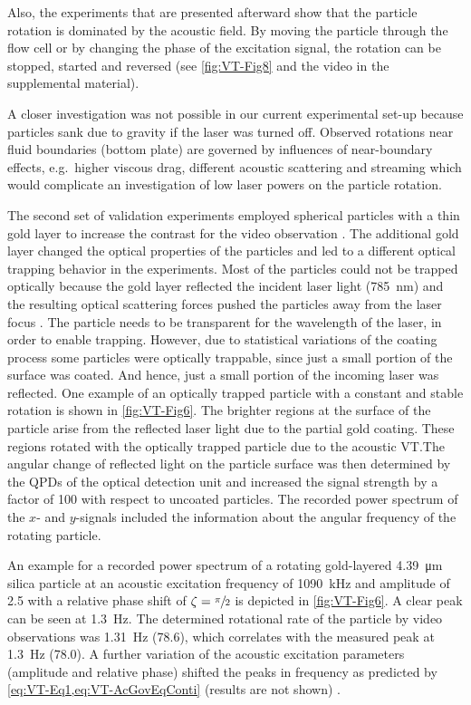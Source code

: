 Also, the experiments that are presented afterward show that the particle 
rotation is dominated by the acoustic field. By moving the particle through the 
flow cell or by changing the phase of the excitation signal, the rotation can be 
stopped, started and reversed (see \cref{fig:VT-Fig8} and the video in the 
supplemental material).

A closer investigation was not possible in our current experimental set-up 
because particles sank due to gravity if the laser was turned off. Observed 
rotations near fluid boundaries (bottom plate) are governed by influences of 
near-boundary effects, e.g.\ higher viscous drag, different acoustic scattering 
and streaming which would complicate an investigation of low laser powers on the 
particle rotation.

The second set of validation experiments employed spherical particles with a 
thin gold layer to increase the contrast for the video observation 
\cite{Lamprecht2013}. The additional gold layer changed the optical properties of 
the particles and led to a different optical trapping behavior in the 
experiments. Most of the particles could not be trapped optically because the 
gold layer reflected the incident laser light (\SI{785}{\nano\meter}) and the 
resulting optical scattering forces pushed the particles away from the laser 
focus \cite{Zhou2020,Ashkin1992,Svoboda1994}. The particle needs to be 
transparent for the wavelength of the laser, in order to enable trapping. 
However, due to statistical variations of the coating process some particles 
were optically trappable, since just a small portion of the surface was coated.  
And hence, just a small portion of the incoming laser was reflected. One example 
of an optically trapped particle with a constant and stable rotation is shown in 
\cref{fig:VT-Fig6}. The brighter regions at the surface of the particle arise from 
the reflected laser light due to the partial gold coating.  These regions 
rotated with the optically trapped particle due to the acoustic VT.\@ The 
angular change of reflected light on the particle surface was then determined by 
the QPDs of the optical detection unit and increased the signal strength by a 
factor of 100 with respect to uncoated particles. The recorded power spectrum of 
the $x$- and $y$-signals included the information about the angular frequency of 
the rotating particle.

An example for a recorded power spectrum of a rotating gold-layered 
\SI{4.39}{\micro\meter} silica particle at an acoustic excitation frequency of 
\SI{1090}{\kilo\hertz} and amplitude of \SI{2.5}{\Vrms} with a relative phase 
shift of $\zeta= \sfrac{\pi}{2}$ is depicted in \cref{fig:VT-Fig6}. A clear peak 
can be seen at \SI{1.3}{\hertz}. The determined rotational rate of the particle 
by video observations was \SI{1.31}{\hertz} (\SI{78.6}{\rpm}), which correlates 
with the measured peak at \SI{1.3}{\hertz} (\SI{78.0}{\rpm}).  A further 
variation of the acoustic excitation parameters (amplitude and relative phase) 
shifted the peaks in frequency as predicted by 
\cref{eq:VT-Eq1,eq:VT-AcGovEqConti} (results are not shown) 
\cite{Lamprecht2013}.

